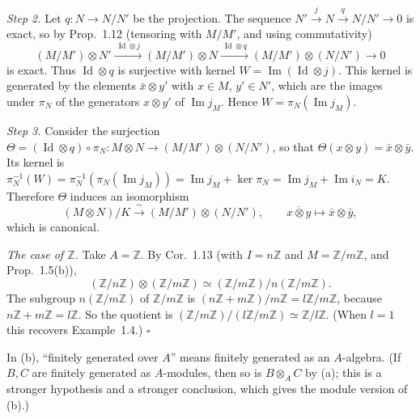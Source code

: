 \documentclass[11pt]{article}
\begin{document}
\emph{Step 2.} Let $q:N\to N/N'$ be the projection. The sequence $N'\xrightarrow{j}N\xrightarrow{q}N/N'\to0$ is exact, so by Prop.~1.12 (tensoring with $M/M'$, and using commutativity)
\[ (M/M')\otimes N'\xrightarrow{\ \operatorname{Id}\otimes j\ }(M/M')\otimes N\xrightarrow{\ \operatorname{Id}\otimes q\ }(M/M')\otimes(N/N')\to0 \]
is exact. Thus $\operatorname{Id}\otimes q$ is surjective with kernel $W=\operatorname{Im}(\operatorname{Id}\otimes j)$. This kernel is generated by the elements $\bar x\otimes y'$ with $x\in M$, $y'\in N'$, which are the images under $\pi_N$ of the generators $x\otimes y'$ of $\operatorname{Im}j_M$. Hence $W=\pi_N(\operatorname{Im}j_M)$.

\emph{Step 3.} Consider the surjection $\Theta=(\operatorname{Id}\otimes q)\circ\pi_N:M\otimes N\to(M/M')\otimes(N/N')$, so that $\Theta(x\otimes y)=\bar x\otimes\bar y$. Its kernel is $\pi_N^{-1}(W)=\pi_N^{-1}(\pi_N(\operatorname{Im}j_M))=\operatorname{Im}j_M+\ker\pi_N=\operatorname{Im}j_M+\operatorname{Im}i_N=K$. Therefore $\Theta$ induces an isomorphism
\[ (M\otimes N)/K\xrightarrow{\ \sim\ }(M/M')\otimes(N/N'),\qquad \overline{x\otimes y}\mapsto\bar x\otimes\bar y, \]
which is canonical.

\emph{The case of $\mathbb Z$.} Take $A=\mathbb Z$. By Cor.~1.13 (with $I=n\mathbb Z$ and $M=\mathbb Z/m\mathbb Z$, and Prop.~1.5(b)),
\[ (\mathbb Z/n\mathbb Z)\otimes(\mathbb Z/m\mathbb Z)\simeq(\mathbb Z/m\mathbb Z)\big/n(\mathbb Z/m\mathbb Z). \]
The subgroup $n(\mathbb Z/m\mathbb Z)$ of $\mathbb Z/m\mathbb Z$ is $(n\mathbb Z+m\mathbb Z)/m\mathbb Z=l\mathbb Z/m\mathbb Z$, because $n\mathbb Z+m\mathbb Z=l\mathbb Z$. So the quotient is $(\mathbb Z/m\mathbb Z)/(l\mathbb Z/m\mathbb Z)\simeq\mathbb Z/l\mathbb Z$. (When $l=1$ this recovers Example~1.4.) \hfill$\square$

\pf
In (b), ``finitely generated over $A$'' means finitely generated as an $A$-algebra. (If $B,C$ are finitely generated as $A$-modules, then so is $B\otimes_A C$ by (a); this is a stronger hypothesis and a stronger conclusion, which gives the module version of (b).)
\end{document}
